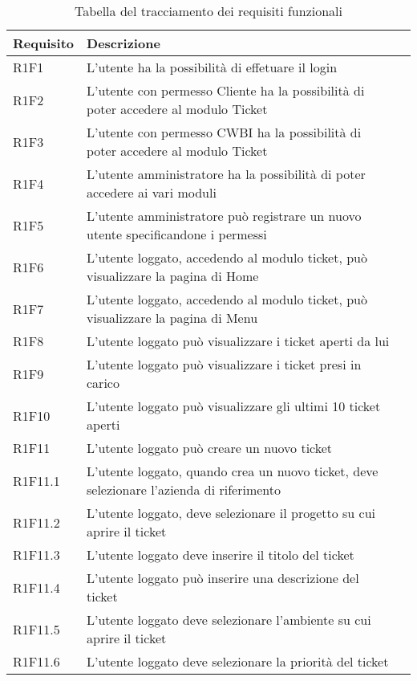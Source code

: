 \begin{table}[!h]
\caption{Tabella del tracciamento dei requisiti funzionali}
{\renewcommand{\arraystretch}{2}
\label{tab:requisiti-funzionali}
\begin{tabularx}{\textwidth}{lXl}
\hline\hline
\textbf{Requisito} & \textbf{Descrizione}\\
\hline

R1F1 & L'utente ha la possibilità di effetuare il login\\
\hline
R1F2 & L'utente con permesso Cliente ha la possibilità di poter accedere al modulo Ticket\\
\hline
R1F3 & L'utente con permesso CWBI ha la possibilità di poter accedere al modulo Ticket\\
\hline
R1F4	 & L'utente amministratore ha la possibilità di poter accedere ai vari moduli\\
\hline
R1F5 & L'utente amministratore può registrare un nuovo utente specificandone i permessi\\
\hline
R1F6 & L'utente loggato, accedendo al modulo ticket, può visualizzare la pagina di Home\\
\hline
R1F7 & L'utente loggato, accedendo al modulo ticket, può visualizzare la pagina di Menu\\
\hline
R1F8 & L'utente loggato può visualizzare i ticket aperti da lui\\
\hline
R1F9 & L'utente loggato può visualizzare i ticket presi in carico\\
\hline
R1F10 & L'utente loggato può visualizzare gli ultimi 10 ticket aperti\\
\hline

R1F11 & L'utente loggato può creare un nuovo ticket\\
\hline
R1F11.1 & L'utente loggato, quando crea un nuovo ticket, deve selezionare l'azienda di riferimento\\
\hline
R1F11.2 & L'utente loggato, deve selezionare il progetto su cui aprire il ticket\\
\hline
R1F11.3 & L'utente loggato deve inserire il titolo del ticket\\
\hline
R1F11.4 & L'utente loggato può inserire una descrizione del ticket\\
\hline
R1F11.5 & L'utente loggato deve selezionare l'ambiente su cui aprire il ticket\\
\hline
R1F11.6 & L'utente loggato deve selezionare la priorità del ticket\\
\hline

\end{tabularx}
}
\end{table}


